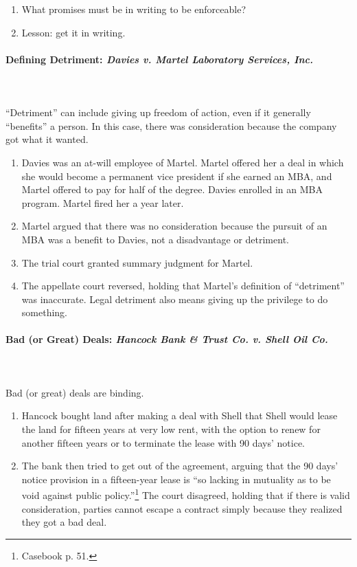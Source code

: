 \begin{enumerate}
    \item What promises must be in writing to be enforceable?
    \item Lesson: get it in writing.
\end{enumerate}

\paragraph{Defining Detriment: \emph{Davies v. Martel Laboratory Services, 
Inc.}}
~\\\\
``Detriment'' can include giving up freedom of action, even if it generally 
``benefits'' a person. In this case, there was consideration because the 
company got what it wanted.

\begin{enumerate}
    \item Davies was an at-will employee of Martel. Martel offered her a 
    deal in which she would become a permanent vice president if she 
    earned an MBA, and Martel offered to pay for half of the degree. Davies 
    enrolled in an MBA program. Martel fired her a year later.
    \item Martel argued that there was no consideration because the pursuit of 
    an MBA was a benefit to Davies, not a disadvantage or detriment.
    \item The trial court granted summary judgment for Martel.
    \item The appellate court reversed, holding that Martel's definition of 
    ``detriment'' was inaccurate. Legal detriment also means giving up the 
    privilege to do something.
\end{enumerate}

\paragraph{Bad (or Great) Deals: \emph{Hancock Bank \& Trust Co. v. Shell Oil 
Co.}}
~\\\\
Bad (or great) deals are binding.

\begin{enumerate}
    \item Hancock bought land after making a deal with Shell that Shell would 
    lease the land for fifteen years at very low rent, with the option to 
    renew for another fifteen years or to terminate the lease with 90 days' 
    notice.
    \item The bank then tried to get out of the agreement, arguing that the 90 
    days' notice provision in a fifteen-year lease is ``so lacking in 
    mutuality as to be void against public policy.''\footnote{Casebook p. 51.} 
    The court disagreed, holding that if there is valid consideration, parties 
    cannot escape a contract simply because they realized they got a bad deal.
\end{enumerate}

